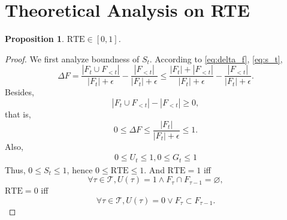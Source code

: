 \documentclass{article} %
\newtheorem{proposition}{Proposition}
\newcommand{\df}{\Delta F}
\newcommand{\facts}{F}
\begin{document}
\section{Theoretical Analysis on RTE}
\begin{proposition}
    $\mathrm{RTE}\in\left[0,1\right]$.
\end{proposition}
\begin{proof}
    We first analyze boundness of $S_t$. According to \eqref{eq:delta_f}, \eqref{eq:s_t},
    \begin{equation}
        \df=\frac{|\facts_t \cup \facts_{<t}|}{|\facts_t|+\epsilon} - \frac{|\facts_{<t}|}{|\facts_t|+\epsilon}\leq \frac{|\facts_t| + |\facts_{<t}|}{|\facts_t|+\epsilon}-\frac{|\facts_{<t}|}{|\facts_t|+\epsilon}.
    \end{equation}
    Besides,
    \begin{equation}
        |\facts_t \cup \facts_{<t}|-|\facts_{<t}|\geq 0,
    \end{equation}
    that is,
    \begin{equation}
        0\leq \df\leq \frac{|\facts_t|}{|\facts_t|+\epsilon}\leq 1.
    \end{equation}
    Also, 
    \begin{align}
        0\leq U_t\leq 1,
        0\leq G_t\leq 1
    \end{align}
    Thus, $0\leq S_t\leq 1$, hence $0\leq \mathrm{RTE}\leq 1$. And $\mathrm{RTE}=1$ iff 
    \begin{equation}
        \forall \tau\in\mathcal{T},U(\tau)=1\land \facts_\tau\cap\facts_{\tau-1}=\varnothing,
    \end{equation}
    $\mathrm{RTE}=0$ iff 
    \begin{equation}
        \forall \tau \in\mathcal{T},U(\tau)=0\lor \facts_\tau\subset\facts_{\tau-1}.
    \end{equation}
\end{proof}
\end{document}
